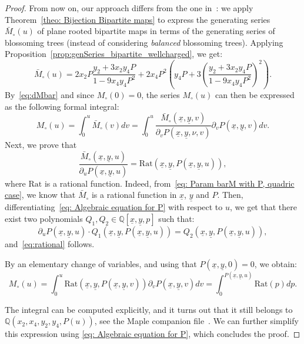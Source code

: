 \documentclass[11pt,reqno,tbtags]{amsart}
\newcommand{\ux}{\underline{x}}
\newcommand{\uy}{\underline{y}}
\numberwithin{equation}{section}
\numberwithin{theo}{section}
\theoremstyle{definition}
\begin{document}
\begin{proof}
From now on, our approach differs from the one in~\cite{BousquetMelouSchaeffer_Bipartite}: we apply Theorem~\ref{theo: Bijection Bipartite maps} to express the generating series $\bar{M}_\circ(u)$ of plane rooted bipartite maps in terms of the generating series of blossoming trees (instead of considering \emph{balanced} blossoming trees). Applying Proposition~\ref{prop:genSeries_bipartite_wellcharged}, we get:
\begin{equation}\label{eq: Param barM with P, quadric case}
	\bar{M}_\circ(u) = 2x_2 P\frac{y_2 + 3x_2y_4P}{1-9x_4y_4P^2} +  2x_4P^2\left(y_4P + 3\left(\frac{y_2 + 3x_2y_4P }{1-9x_4y_4P^2}\right)^2\right).
\end{equation}
By~\eqref{eq:dMbar} and since $M_\circ(0)=0$, the series $M_\circ(u)$ can then be expressed as the following formal integral:
\begin{equation}
	M_\circ(u) = \int_0^u \bar{M}_\circ(v)dv = \int_0^u \frac{\bar{M}_\circ(\ux,\uy,v)}{\partial_vP(\ux,\uy,\nu,v)} \partial_vP(\ux,\uy,v)dv.
\end{equation}
Next, we prove that 
\begin{equation}\label{eq:rational}
\frac{\bar{M}_\circ(\ux,\uy, u)}{\partial_uP(\ux,\uy,u)} = \mathrm{Rat}(\ux,\uy,P(\ux,\uy,u)),
\end{equation}
where $\mathrm{Rat}$ is a rational function. Indeed, from~\eqref{eq: Param barM with P, quadric case}, we know that $\bar{M}_\circ$ is a rational function in $\ux$, $\uy$ and $P$. Then, differentiating~\eqref{eq: Algebraic equation for P} with respect to $u$, we get that there exist two polynomials $Q_1,Q_2\in \mathbb{Q}[\ux,\uy,p]$ such that: 
\[
\partial_u P(\ux,\uy,u) \cdot Q_1(\ux,\uy,P(\ux,\uy,u))= Q_2(\ux,\uy,P(\ux,\uy,u)),
\]
and~\eqref{eq:rational} follows.

By an elementary change of variables, and using that $P(\ux,\uy,0)=0$, we obtain: 
\[
M_\circ(u) = \int_0^u \mathrm{Rat}(\ux,\uy,P(\ux,\uy,v))\partial_vP(\ux,\uy,v)dv = \int_0^{P(\ux,\uy,u)} \mathrm{Rat}(p) dp.
\]

The integral can be computed explicitly, and it turns out that it still belongs to $\mathbb{Q}(x_2,x_4,y_2,y_4,P(u))$, see the Maple companion file~\cite{Maple}. We can further simplify this expression using \eqref{eq: Algebraic equation for P}, which concludes the proof. 
\end{proof}
\end{document}
